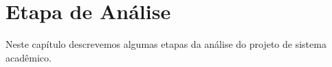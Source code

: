 \chapter{Etapa de Análise}
    Neste capítulo descrevemos algumas etapas da análise do projeto de sistema acadêmico.
    

